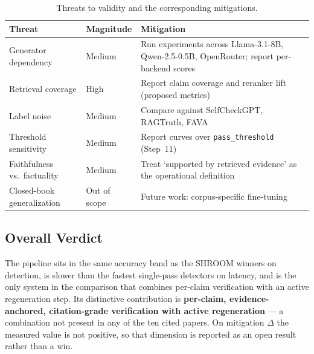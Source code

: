 \begin{table}[ht]
\centering
\small
\begin{tabular}{p{3.5cm}p{1.8cm}p{9cm}}
\hline
\textbf{Threat} & \textbf{Magnitude} & \textbf{Mitigation} \\
\hline
Generator dependency & Medium & Run experiments across Llama-3.1-8B, Qwen-2.5-0.5B, OpenRouter; report per-backend scores \\
Retrieval coverage & High & Report claim coverage and reranker lift (proposed metrics) \\
Label noise & Medium & Compare against SelfCheckGPT, RAGTruth, FAVA \\
Threshold sensitivity & Medium & Report curves over \texttt{pass\_threshold} (Step~11) \\
Faithfulness vs.\ factuality & Medium & Treat `supported by retrieved evidence' as the operational definition \\
Closed-book generalization & Out of scope & Future work: corpus-specific fine-tuning \\
\hline
\end{tabular}
\caption{Threats to validity and the corresponding mitigations.}
\label{tab:threat}
\end{table}

\subsection{Overall Verdict}
\label{sec:verdict}

The pipeline sits in the same accuracy band as the SHROOM winners on
detection, is slower than the fastest single-pass detectors on latency,
and is the only system in the comparison that combines per-claim
verification with an active regeneration step. Its distinctive
contribution is \textbf{per-claim, evidence-anchored, citation-grade
verification with active regeneration} --- a combination not present in any
of the ten cited papers. On mitigation $\Delta$ the measured value is not
positive, so that dimension is reported as an open result rather than a win.